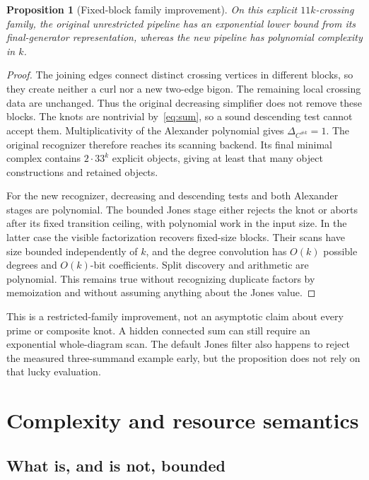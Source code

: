 \documentclass[11pt]{article}
\newtheorem{proposition}{Proposition}[section]
\begin{document}
\begin{proposition}[Fixed-block family improvement]
On this explicit $11k$-crossing family, the original unrestricted pipeline
has an exponential lower bound from its final-generator representation,
whereas the new pipeline has polynomial complexity in $k$.
\end{proposition}
\begin{proof}
The joining edges connect distinct crossing vertices in different blocks, so
they create neither a curl nor a new two-edge bigon. The remaining local
crossing data are unchanged. Thus the original decreasing simplifier does not
remove these blocks. The knots are nontrivial by~\eqref{eq:sum}, so a sound
descending test cannot accept them. Multiplicativity of the Alexander
polynomial gives $\Delta_{C^{\#k}}=1$. The original recognizer therefore reaches
its scanning backend. Its final minimal complex contains $2\cdot33^k$ explicit
objects, giving at least that many object constructions and retained objects.

For the new recognizer, decreasing and descending tests and both Alexander
stages are polynomial. The bounded Jones stage either rejects the knot or
aborts after its fixed transition ceiling, with polynomial work in the input
size. In the latter case the visible factorization recovers fixed-size blocks.
Their scans have size bounded independently of $k$, and the degree convolution
has $O(k)$ possible degrees and $O(k)$-bit coefficients. Split discovery and
arithmetic are polynomial. This remains true without recognizing duplicate
factors by memoization and without assuming anything about the Jones value.
\end{proof}

This is a restricted-family improvement, not an asymptotic claim about every
prime or composite knot. A hidden connected sum can still require an
exponential whole-diagram scan. The default Jones filter also happens to reject
the measured three-summand example early, but the proposition does not rely on
that lucky evaluation.

\section{Complexity and resource semantics}

\subsection{What is, and is not, bounded}
\end{document}

